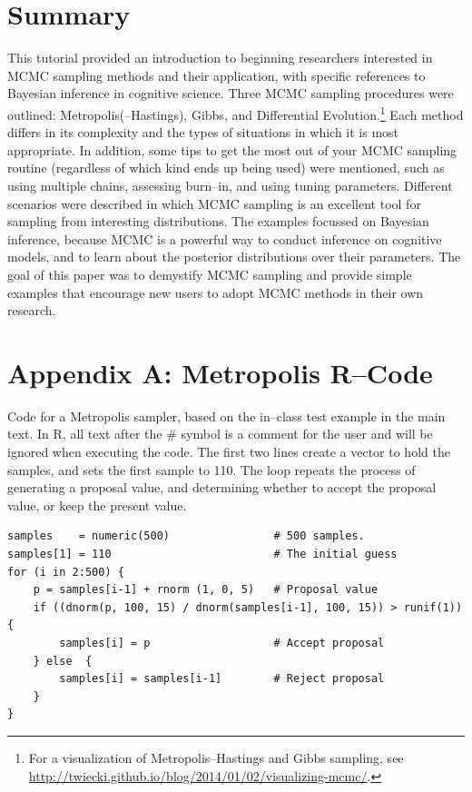 \section{Summary}

This tutorial provided an introduction to beginning researchers interested in MCMC sampling methods and their application, with specific references to Bayesian inference in cognitive science. Three MCMC sampling procedures were outlined: Metropolis(--Hastings), Gibbs, and Differential Evolution.\footnote{For a visualization of Metropolis--Hastings and Gibbs sampling, see \url{http://twiecki.github.io/blog/2014/01/02/visualizing-mcmc/}.} Each method differs in its complexity and the types of situations in which it is most appropriate. In addition, some tips to get the most out of your MCMC sampling routine (regardless of which kind ends up being used) were mentioned, such as using multiple chains, assessing burn--in, and using tuning parameters. Different scenarios were described in which MCMC sampling is an excellent tool for sampling from interesting distributions. The examples focussed on Bayesian inference, because MCMC is a powerful way to conduct inference on cognitive models, and to learn about the posterior distributions over their parameters. The goal of this paper was to demystify MCMC sampling and provide simple examples that encourage new users to adopt MCMC methods in their own research.




\clearpage\section*{Appendix A: Metropolis R--Code}

Code for a Metropolis sampler, based on the in--class test example in the main text. In R, all text after the \# symbol is a comment for the user and will be ignored when executing the code. The first two lines create a vector to hold the samples, and sets the first sample to 110. The loop repeats the process of generating a proposal value, and determining whether to accept the proposal value, or keep the present value.

\begin{verbatim}
samples    = numeric(500)                # 500 samples.
samples[1] = 110                         # The initial guess
for (i in 2:500) {
    p = samples[i-1] + rnorm (1, 0, 5)   # Proposal value
    if ((dnorm(p, 100, 15) / dnorm(samples[i-1], 100, 15)) > runif(1)) { 
        samples[i] = p                   # Accept proposal
    } else  {
        samples[i] = samples[i-1]        # Reject proposal
    }
}
\end{verbatim}


